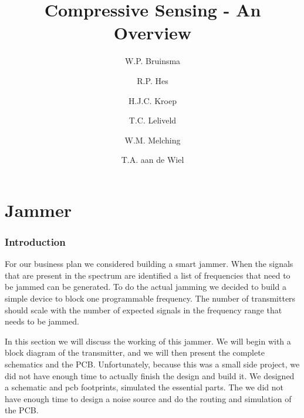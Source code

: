 \documentclass[a4paper, openany, oneside]{memoir}
\title{Compressive Sensing - An Overview}
\author{W.P. Bruinsma \and R.P. Hes \and H.J.C. Kroep \and T.C. Leliveld \and W.M. Melching \and T.A. aan de Wiel}
\begin{document}
\chapter{Jammer}
\label{cha:jammer}

\subsection{Introduction}
For our business plan we considered building a smart jammer. When the signals that are present in the spectrum are identified a list of frequencies that need to be jammed can be generated. To do the actual jamming we decided to build a simple device to block one programmable frequency. The number of transmitters should scale with the number of expected signals in the frequency range that needs to be jammed.

In this section we will discuss the working of this jammer. We will begin with a block diagram of the transmitter, and we will then present the complete schematics and the PCB. Unfortunately, because this was a small side project, we did not have enough time to actually finish the design and build it. We designed a schematic and pcb footprints, simulated the essential parts. The we did not have enough time to design a noise source and do the routing and simulation of the PCB.
\end{document}
